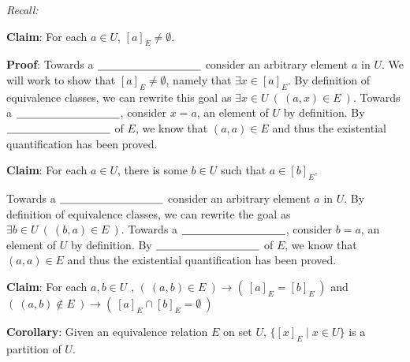 
{\it Recall:} 




{\bf Claim}: For each  $a \in U$, $[a]_{E}  \neq  \emptyset$.

{\bf Proof}: Towards a $\underline{\phantom{\hspace{1.3in}}}$ 
consider an arbitrary element $a$ in $U$. 
We will work to show that $[a]_E \neq \emptyset$, namely that $\exists x \in [a]_E$.
By definition of equivalence classes, we can rewrite this goal as 
$\exists x \in U ~( ~(a,x) \in E~)$. 
Towards a $\underline{\phantom{\hspace{1.3in}}}$, consider $x = a$, 
an element of $U$ by definition. By $\underline{\phantom{\hspace{1.3in}}}$ of $E$, 
we know that $(a,a) \in E$  and thus the existential quantification has been proved.

\vspace{20pt}

{\bf Claim}: For each $a \in U$, there is some $b \in U$  such that $a \in [b]_{E}$.

Towards a $\underline{\phantom{\hspace{1.3in}}}$ 
consider an arbitrary element $a$ in $U$. By definition of equivalence classes, 
we can rewrite the goal as 
$\exists b \in U ~( ~(b,a) \in E~)$. 
Towards a $\underline{\phantom{\hspace{1.3in}}}$, consider $b = a$, 
an element of $U$ by definition. By $\underline{\phantom{\hspace{1.3in}}}$  of $E$, 
we know that $(a,a) \in E$  and thus the existential quantification has been proved. 
 
\vspace{20pt}

{\bf Claim}: For each  $a,b  \in U$ , $(~(a,b)  \in  E ~)\to (~ [a]_{E}  = [b]_{E}~)$
and  $(~(a,b)  \notin  E ~)\to (~ [a]_{E} \cap[b]_{E} = \emptyset~)$

\vspace{200pt}

{\bf Corollary}: Given an equivalence relation $E$ on set $U$,  $\{ [x]_{E} \mid x \in U  \}$ is a partition of $U$.

